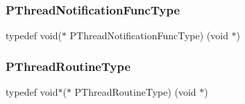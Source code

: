 \subsubsection{\texorpdfstring{P\+Thread\+Notification\+Func\+Type}{PThreadNotificationFuncType}}
{\footnotesize\ttfamily typedef void($\ast$ P\+Thread\+Notification\+Func\+Type) (void $\ast$)}

\mbox{\label{group__FUNC__DEFS_gaeef66643e734485d781ca826339879ea}} 
\subsubsection{\texorpdfstring{P\+Thread\+Routine\+Type}{PThreadRoutineType}}
{\footnotesize\ttfamily typedef void$\ast$($\ast$ P\+Thread\+Routine\+Type) (void $\ast$)}

